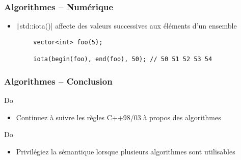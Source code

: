 \documentclass[C++.tex]{subfiles}
\begin{document}
\begin{frame}[fragile]
	\frametitle{Algorithmes -- Numérique}
	\begin{itemize}
		\item \texttt|std::iota()| affecte des valeurs successives aux éléments d'un ensemble
	\end{itemize}

	\begin{verbatim}
		vector<int> foo(5);

		iota(begin(foo), end(foo), 50); // 50 51 52 53 54
	\end{verbatim}

\end{frame}

\begin{frame}[fragile]
	\frametitle{Algorithmes -- Conclusion}
	\begin{exampleblock}{Do}
		\begin{itemize}
			\item Continuez à suivre les règles C++98/03 à propos des algorithmes
		\end{itemize}
	\end{exampleblock}

	\begin{exampleblock}{Do}
		\begin{itemize}
			\item Privilégiez la sémantique lorsque plusieurs algorithmes sont utilisables
		\end{itemize}
	\end{exampleblock}
\end{frame}
\end{document}
